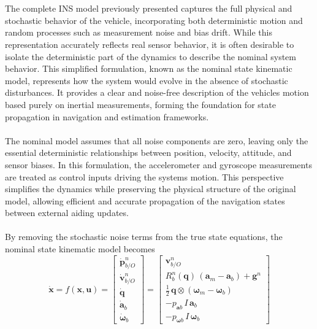 \\ \\
The complete INS model previously presented captures the full physical and stochastic behavior of the vehicle, incorporating both deterministic motion and random processes such as measurement noise and bias drift. While this representation accurately reflects real sensor behavior, it is often desirable to isolate the deterministic part of the dynamics to describe the nominal system behavior. This simplified formulation, known as the nominal state kinematic model, represents how the system would evolve in the absence of stochastic disturbances. It provides a clear and noise-free description of the vehicles motion based purely on inertial measurements, forming the foundation for state propagation in navigation and estimation frameworks.  
\\ \\
The nominal model assumes that all noise components are zero, leaving only the essential deterministic relationships between position, velocity, attitude, and sensor biases. In this formulation, the accelerometer and gyroscope measurements are treated as control inputs driving the systems motion. This perspective simplifies the dynamics while preserving the physical structure of the original model, allowing efficient and accurate propagation of the navigation states between external aiding updates.  
\\ \\
By removing the stochastic noise terms from the true state equations, the nominal state kinematic model becomes
\begin{equation}
    \dot{\mathbf{x}} = f(\mathbf{x}, \mathbf{u}) =
    \begin{bmatrix}
        \dot{\mathbf{p}}_{b/O}^{n} \\
        \dot{\mathbf{v}}_{b/O}^{n} \\
        \dot{\mathbf{q}} \\
        \dot{\mathbf{a}}_b \\
        \dot{\mathbf{\omega}}_b
    \end{bmatrix}
    =
    \begin{bmatrix}
        \mathbf{v}_{b/O}^{n} \\
        R_b^n(\mathbf{q})\,(\mathbf{a}_m - \mathbf{a}_{b}) + \mathbf{g}^n \\
        \tfrac{1}{2}\,\mathbf{q} \otimes (\boldsymbol{\omega}_m - \mathbf{\omega}_{b}) \\
        -p_{\mathbf{a}b}\,I\,\mathbf{a}_b \\
        -p_{\mathbf{\omega}b}\,I\,\mathbf{\omega}_b
    \end{bmatrix}
    \label{eq:kinematics-motion-model}
\end{equation}
